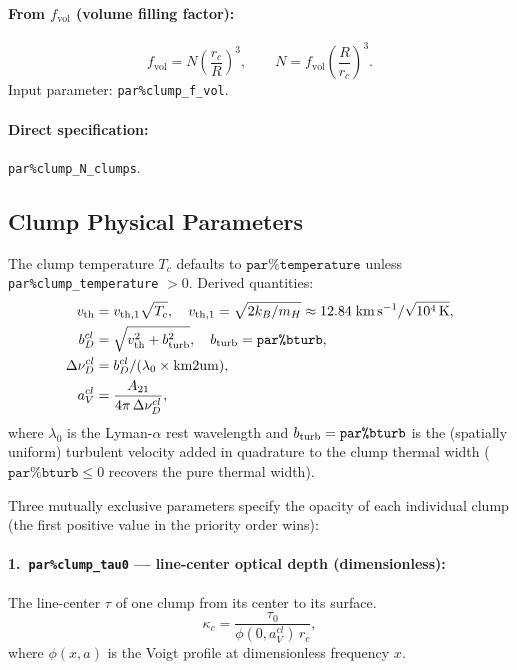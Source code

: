 \documentclass[english,a4paper]{my_memo}
\begin{document}
\paragraph{From $f_\mathrm{vol}$ (volume filling factor):}
\begin{equation}
  f_\mathrm{vol} = N\left(\frac{r_c}{R}\right)^3 ,
  \qquad N = f_\mathrm{vol}\!\left(\frac{R}{r_c}\right)^3 .
\end{equation}
Input parameter: \texttt{par\%clump\_f\_vol}.

\paragraph{Direct specification:} \texttt{par\%clump\_N\_clumps}.

\subsection{Clump Physical Parameters}

The clump temperature $T_c$ defaults to $\texttt{par\%temperature}$ unless
\texttt{par\%clump\_temperature} $> 0$.  Derived quantities:
\begin{align}
  v_\mathrm{th} &= v_{\mathrm{th},1}\sqrt{T_c},\quad
                   v_{\mathrm{th},1} = \sqrt{2k_B/m_H}\approx 12.84\;\mathrm{km\,s^{-1}/\sqrt{10^4\,K}},\\
  b_D^{cl} &= \sqrt{v_\mathrm{th}^2 + b_{\rm turb}^2},\quad b_{\rm turb} = \texttt{par\%bturb},\\
  \Delta\nu_D^{cl} &= b_D^{cl} / (\lambda_0 \times \mathrm{km2um}),\\
  a_V^{cl} &= \frac{A_{21}}{4\pi\,\Delta\nu_D^{cl}},
\end{align}
where $\lambda_0$ is the Lyman-$\alpha$ rest wavelength and $b_{\rm turb} =
\texttt{par\%bturb}$ is the (spatially uniform) turbulent velocity added in
quadrature to the clump thermal width ($\texttt{par\%bturb}\le 0$ recovers
the pure thermal width).

Three mutually exclusive parameters specify the opacity of each individual
clump (the first positive value in the priority order wins):

\paragraph{1.~\texttt{par\%clump\_tau0} — line-center optical depth (dimensionless):}
The line-center $\tau$ of one clump from its center to its surface.
\begin{equation}
  \kappa_c = \frac{\tau_0}{\phi(0,a_V^{cl})\, r_c},
\end{equation}
where $\phi(x, a)$ is the Voigt profile at dimensionless frequency $x$.
\end{document}
